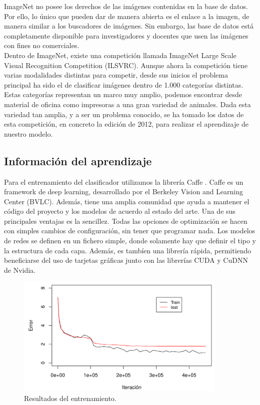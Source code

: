 ImageNet no posee los derechos de las imágenes contenidas en la base de datos. Por ello, lo único que pueden dar de manera abierta es el enlace a la imagen, de manera similar a los buscadores de imágenes. Sin embargo, las base de datos está completamente disponible para investigadores y docentes que usen las imágenes con fines no comerciales.\\

Dentro de ImageNet, existe una competición llamada ImageNet Large Scale Visual Recognition Competition (ILSVRC). Aunque ahora la competición tiene varias modalidades distintas para competir, desde sus inicios el problema principal ha sido el de clasificar imágenes dentro de 1.000 categorías distintas. Estas categorías representan un marco muy amplio, podemos encontrar desde material de oficina como impresoras a una gran variedad de animales. Dada esta variedad tan amplia, y a ser un problema conocido, se ha tomado los datos de esta competición, en concreto la edición de 2012, para realizar el aprendizaje de nuestro modelo.\\

\subsection{Información del aprendizaje}

Para el entrenamiento del clasificador utilizamos la librería Caffe \cite{jia2014caffe}. Caffe es un framework de deep learning, desarrollado por el  Berkeley Vision and Learning Center (BVLC). Además, tiene una amplia comunidad que ayuda a mantener el código del proyecto y los modelos de acuerdo al estado del arte. Una de sus principales ventajas es la sencillez. Todas las opciones de optimización se hacen con simples cambios de configuración, sin tener que programar nada. Los modelos de redes se definen en un fichero simple, donde solamente hay que definir el tipo y la estructura de cada capa. Además, es tambíen una librería rápida, permitiendo beneficiarse del uso de tarjetas gráficas junto con las librerías CUDA y CuDNN de Nvidia.\\

\begin{figure}[H]
\begin{center}

\includegraphics[width=0.9\textwidth]{img/resultados.png}
\end{center}

\caption{Resultados del entrenamiento.}
\label{resultados}
\end{figure}

